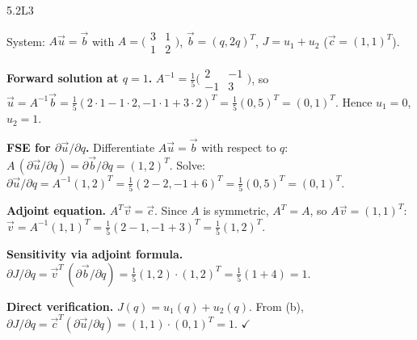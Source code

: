 \begin{solution}{5.2}{L3}

\solanswer

System: $A\vec{u} = \vec{b}$ with $A = \bigl(\begin{smallmatrix}3&1\\1&2\end{smallmatrix}\bigr)$,
$\vec{b} = (q, 2q)^T$, $J = u_1 + u_2$ ($\vec{c} = (1,1)^T$).

 \textbf{Forward solution at $q = 1$.}
$A^{-1} = \frac{1}{5}\bigl(\begin{smallmatrix}2&-1\\-1&3\end{smallmatrix}\bigr)$,
so $\vec{u} = A^{-1}\vec{b} = \frac{1}{5}(2\cdot1 - 1\cdot2, -1\cdot1+3\cdot2)^T
= \frac{1}{5}(0,5)^T = (0, 1)^T$.
Hence $u_1 = 0$, $u_2 = 1$.

 \textbf{FSE for $\partial\vec{u}/\partial q$.}
Differentiate $A\vec{u} = \vec{b}$ with respect to $q$:
$A\,(\partial\vec{u}/\partial q) = \partial\vec{b}/\partial q = (1,2)^T$.
Solve: $\partial\vec{u}/\partial q = A^{-1}(1,2)^T
= \frac{1}{5}(2-2,-1+6)^T = \frac{1}{5}(0,5)^T = (0, 1)^T$.

 \textbf{Adjoint equation.}
$A^T\vec{v} = \vec{c}$. Since $A$ is symmetric, $A^T = A$, so
$A\vec{v} = (1,1)^T$:
$\vec{v} = A^{-1}(1,1)^T = \frac{1}{5}(2-1,-1+3)^T = \frac{1}{5}(1,2)^T$.

 \textbf{Sensitivity via adjoint formula.}
$\partial J/\partial q = \vec{v}^T\,(\partial\vec{b}/\partial q)
= \frac{1}{5}(1,2)\cdot(1,2)^T = \frac{1}{5}(1+4) = 1$.

 \textbf{Direct verification.}
$J(q) = u_1(q) + u_2(q)$. From (b), $\partial J/\partial q
= \vec{c}^T(\partial\vec{u}/\partial q) = (1,1)\cdot(0,1)^T = 1$. $\checkmark$


\end{solution}

